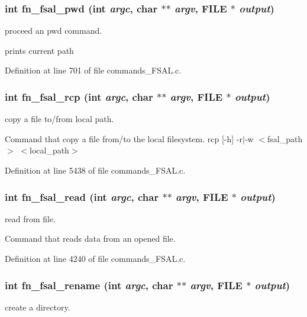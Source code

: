 \subsubsection[{fn\_\-fsal\_\-pwd}]{\setlength{\rightskip}{0pt plus 5cm}int fn\_\-fsal\_\-pwd (int {\em argc}, \/  char $\ast$$\ast$ {\em argv}, \/  FILE $\ast$ {\em output})}\label{commands_8h_a5889873765cfb1062f3fab4ffd7a38cb}
proceed an pwd command.

prints current path 

Definition at line 701 of file commands\_\-FSAL.c.
\subsubsection[{fn\_\-fsal\_\-rcp}]{\setlength{\rightskip}{0pt plus 5cm}int fn\_\-fsal\_\-rcp (int {\em argc}, \/  char $\ast$$\ast$ {\em argv}, \/  FILE $\ast$ {\em output})}\label{commands_8h_a187b923de1fe342ff5e352bbb41acbbe}
copy a file to/from local path.

Command that copy a file from/to the local filesystem. rcp [-\/h] -\/r$|$-\/w $<$fsal\_\-path$>$ $<$local\_\-path$>$ 

Definition at line 5438 of file commands\_\-FSAL.c.
\subsubsection[{fn\_\-fsal\_\-read}]{\setlength{\rightskip}{0pt plus 5cm}int fn\_\-fsal\_\-read (int {\em argc}, \/  char $\ast$$\ast$ {\em argv}, \/  FILE $\ast$ {\em output})}\label{commands_8h_a35036b2c35ca5d8d4c69fe777b3bf61a}
read from file.

Command that reads data from an opened file. 

Definition at line 4240 of file commands\_\-FSAL.c.
\subsubsection[{fn\_\-fsal\_\-rename}]{\setlength{\rightskip}{0pt plus 5cm}int fn\_\-fsal\_\-rename (int {\em argc}, \/  char $\ast$$\ast$ {\em argv}, \/  FILE $\ast$ {\em output})}\label{commands_8h_af1fab75db40fed8f10b568eaa2e1ee83}
create a directory.

